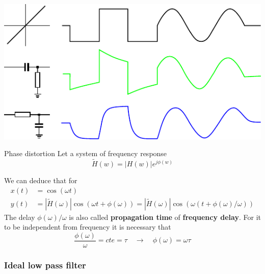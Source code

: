   \begin{center}
    \includegraphics[width=.4\linewidth]{imgs/fourier/distortion.pdf}
  \end{center}
  
  \begin{block}{Phase distortion}
    Let a system of frequency response 
    $$\tilde H(w)=|H(w)|e^{j\phi(w)}$$

  We can deduce that for 
\begin{align*}
x(t)&=\cos(\omega t)\\
y(t)&=|\tilde H(\omega)| \cos(\omega t+ \phi(\omega))=|\tilde H(\omega)| \cos(\omega (t+ \phi(\omega)/\omega))
\end{align*}
The delay $\phi(\omega)/\omega$ is also called  \textbf{propagation time} of \textbf{frequency delay}.  For it to be independent from frequency it is necessary that
\begin{displaymath}
\frac{\phi(\omega)}{\omega}=cte=\tau\quad \rightarrow \quad \phi(\omega)=\omega\tau
\end{displaymath}
  \end{block}

  \frametitle{Ideal low pass filter}

